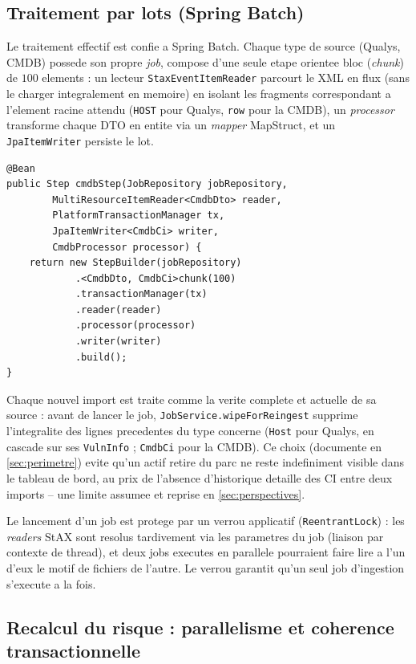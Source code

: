 \subsection{Traitement par lots (Spring Batch)}

Le traitement effectif est confie a Spring Batch. Chaque type de source (Qualys,
CMDB) possede son propre \emph{job}, compose d'une seule etape orientee bloc
(\emph{chunk}) de $100$ elements : un lecteur \texttt{StaxEventItemReader} parcourt le
XML en flux (sans le charger integralement en memoire) en isolant les fragments
correspondant a l'element racine attendu (\texttt{HOST} pour Qualys, \texttt{row}
pour la CMDB), un \emph{processor} transforme chaque DTO en entite via un
\emph{mapper} MapStruct, et un \texttt{JpaItemWriter} persiste le lot.

\begin{lstlisting}[caption={Etape Spring Batch d'ingestion CMDB (BatchConfig)},label={lst:batch}]
@Bean
public Step cmdbStep(JobRepository jobRepository,
        MultiResourceItemReader<CmdbDto> reader,
        PlatformTransactionManager tx,
        JpaItemWriter<CmdbCi> writer,
        CmdbProcessor processor) {
    return new StepBuilder(jobRepository)
            .<CmdbDto, CmdbCi>chunk(100)
            .transactionManager(tx)
            .reader(reader)
            .processor(processor)
            .writer(writer)
            .build();
}
\end{lstlisting}

Chaque nouvel import est traite comme la verite complete et actuelle de sa source :
avant de lancer le job, \texttt{JobService.wipeForReingest} supprime l'integralite
des lignes precedentes du type concerne (\texttt{Host} pour Qualys, en cascade sur
ses \texttt{VulnInfo} ; \texttt{CmdbCi} pour la CMDB). Ce choix (documente en
\cref{sec:perimetre}) evite qu'un actif retire du parc ne reste indefiniment visible
dans le tableau de bord, au prix de l'absence d'historique detaille des CI entre deux
imports -- une limite assumee et reprise en \cref{sec:perspectives}.

Le lancement d'un job est protege par un verrou applicatif
(\texttt{ReentrantLock}) : les \emph{readers} StAX sont resolus tardivement via les
parametres du job (liaison par contexte de thread), et deux jobs executes en
parallele pourraient faire lire a l'un d'eux le motif de fichiers de l'autre. Le
verrou garantit qu'un seul job d'ingestion s'execute a la fois.

\subsection{Recalcul du risque : parallelisme et coherence transactionnelle}

